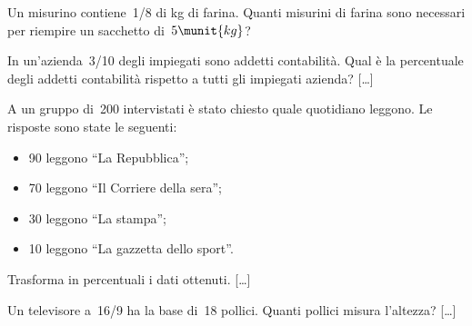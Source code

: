\begin{htmulticols}{2}
\begin{esercizio}
\label{ese:3.183}
 Un misurino contiene~1/8 di kg di farina. Quanti misurini di farina
sono necessari per riempire un sacchetto di~\(5\munit{kg}\)? \sol{\dots}
\end{esercizio}

% 
% 

\begin{esercizio}
\label{ese:3.187}
 In un'azienda~3/10 degli impiegati sono addetti
contabilità. Qual è la percentuale degli addetti contabilità
rispetto a tutti gli impiegati azienda? \hfill [\dots]
\end{esercizio}

\begin{esercizio}
\label{ese:3.188}
 A un gruppo di~200 intervistati è stato chiesto quale quotidiano
leggono. Le risposte sono state le seguenti:
\begin{itemize} [nosep]
\item 90 leggono ``La Repubblica'';
\item 70 leggono ``Il Corriere della sera'';
\item 30 leggono ``La stampa'';
\item 10 leggono ``La gazzetta dello sport''.
\end{itemize}
Trasforma in percentuali i dati ottenuti. \hfill [\dots]
\end{esercizio}

\begin{esercizio}
\label{ese:3.196}
Un televisore a~16/9 ha la base di~18 pollici. Quanti
pollici misura l'altezza? \hfill [\dots]
\end{esercizio}


\end{htmulticols}
